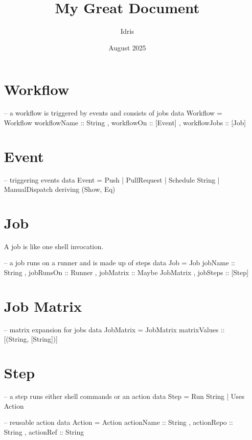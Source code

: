 \documentclass[openany, 12pt]{book}
\title{My Great Document}
\author{Idris}
\date{August 2025}
\begin{document}
\tableofcontents

\chapter{Workflow}

\begin{haskell}{}
-- a workflow is triggered by events and consists of jobs
data Workflow = Workflow
  { workflowName :: String
  , workflowOn   :: [Event]
  , workflowJobs :: [Job]
  }
\end{haskell}

\chapter{Event}
\begin{haskell}{}
-- triggering events
data Event =
      Push
    | PullRequest
    | Schedule String
    | ManualDispatch
deriving (Show, Eq)
\end{haskell}

\chapter{Job}
A job is like one shell invocation.

\begin{haskell}{}
-- a job runs on a runner and is made up of steps
data Job = Job
  { jobName   :: String
  , jobRunsOn :: Runner
  , jobMatrix :: Maybe JobMatrix
  , jobSteps  :: [Step]
  }
\end{haskell}

\chapter{Job Matrix}
\begin{haskell}{}
-- matrix expansion for jobs
data JobMatrix = JobMatrix
  { matrixValues :: [(String, [String])]
  }
\end{haskell}

\chapter{Step}
\begin{haskell}{}
-- a step runs either shell commands or an action
data Step
  = Run String
  | Uses Action

-- reusable action
data Action = Action
  { actionName :: String
  , actionRepo :: String
  , actionRef  :: String
  }
\end{haskell}
\end{document}
